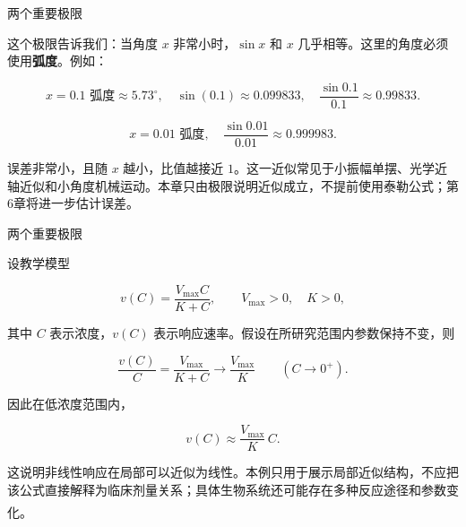 \documentclass[aspectratio=169,10pt,fontset=fandol]{ctexbeamer}
\newcommand{\upcite}[1]{\textsuperscript{\textsuperscript{\cite{#1}}}}
\begin{document}
\begin{frame}[t,fragile]{两个重要极限}
\small
{\small
\begin{application}[物理：小角度近似]



这个极限告诉我们：当角度 \(x\) 非常小时，\(\sin x\) 和 \(x\) 几乎相等。这里的角度必须使用\textbf{弧度}。例如：



\[

x = 0.1 \text{ 弧度} \approx 5.73^\circ,\quad \sin(0.1) \approx 0.099833,\quad \dfrac{\sin 0.1}{0.1} \approx 0.99833.

\]



\[

x = 0.01 \text{ 弧度},\quad \dfrac{\sin 0.01}{0.01} \approx 0.999983.

\]



误差非常小，且随 \(x\) 越小，比值越接近 $1$。这一近似常见于小振幅单摆、光学近轴近似和小角度机械运动。本章只由极限说明近似成立，不提前使用泰勒公式；第6章将进一步估计误差。



\end{application}
}
\end{frame}
\begin{frame}[t,fragile]{两个重要极限}
\footnotesize
{\footnotesize
\begin{application}

设教学模型

\[

v(C)=\frac{V_{\max}C}{K+C},\qquad V_{\max}>0,\quad K>0,

\]

其中 $C$ 表示浓度，$v(C)$ 表示响应速率。假设在所研究范围内参数保持不变，则

\[

\frac{v(C)}{C}=\frac{V_{\max}}{K+C}

\longrightarrow\frac{V_{\max}}K

\qquad(C\to0^+).

\]

因此在低浓度范围内，

\[

v(C)\approx\frac{V_{\max}}K\,C.

\]

这说明非线性响应在局部可以近似为线性。本例只用于展示局部近似结构，不应把该公式直接解释为临床剂量关系；具体生物系统还可能存在多种反应途径和参数变化。\upcite{NCBIEnzyme}

\end{application}
}
\end{frame}
\end{document}
